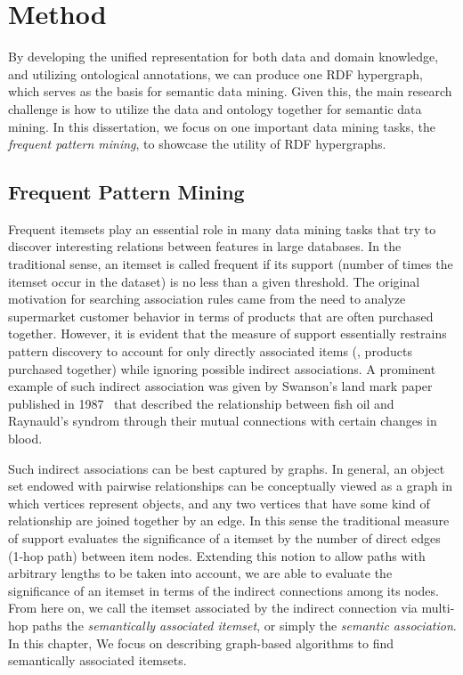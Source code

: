 \section{Method}
By developing the unified representation for both data and domain knowledge, and utilizing ontological annotations, we can produce one RDF hypergraph, which serves as the basis for semantic data mining. Given this, the main research challenge is how to utilize the data and ontology together for semantic data mining. In this dissertation, we focus on one important data mining tasks, the {\em frequent pattern mining}, to showcase the utility of RDF hypergraphs.

\subsection{Frequent Pattern Mining}
\label{sec:association}
Frequent itemsets play an essential role in many data mining tasks that try to discover interesting relations between features in large databases. In the traditional sense, an itemset is called frequent if its support (number of times the itemset occur in the dataset) is no less than a given threshold. The original motivation for searching association rules came from the need to analyze supermarket customer behavior in terms of products that are often purchased together. However, it is evident that the measure of support essentially restrains pattern discovery to account for only directly associated items (\eg, products purchased together) while ignoring possible indirect associations. A prominent example of such indirect association was given by Swanson's land mark paper published in 1987~\cite{swanson87} that described the relationship between fish oil and Raynauld's syndrom through their mutual connections with certain changes in blood.

Such indirect associations can be best captured by graphs. In general, an object set endowed with pairwise relationships can be conceptually viewed as a graph in which vertices represent objects, and any two vertices that have some kind of relationship are joined together by an edge. In this sense the traditional measure of support evaluates the significance of a itemset by the number of direct edges (1-hop path) between item nodes. Extending this notion to allow paths with arbitrary lengths to be taken into account, we are able to evaluate the significance of an itemset in terms of the indirect connections among its nodes. From here on, we call the itemset associated by the indirect connection via multi-hop paths the \emph{semantically associated itemset}, or simply the \emph{semantic association}. In this chapter, We focus on describing graph-based algorithms to find semantically associated itemsets.

